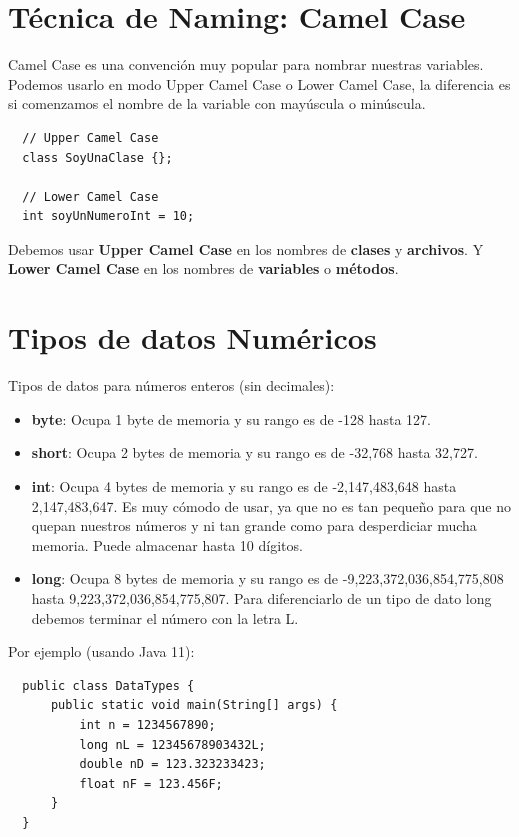 \documentclass{article}
\begin{document}
\section{Técnica de Naming: Camel Case}%
Camel Case es una convención muy popular para nombrar nuestras variables.
Podemos usarlo en modo Upper Camel Case o Lower Camel Case, la diferencia es si
comenzamos el nombre de la variable con mayúscula o minúscula.\\

\begin{verbatim}
  // Upper Camel Case
  class SoyUnaClase {};

  // Lower Camel Case
  int soyUnNumeroInt = 10;
\end{verbatim}

Debemos usar \textbf{Upper Camel Case} en los nombres de \textbf{clases} y
\textbf{archivos}. Y \textbf{Lower Camel Case} en los nombres de
\textbf{variables} o \textbf{métodos}.


\section{Tipos de datos Numéricos}%
Tipos de datos para números enteros (sin decimales):
\begin{itemize}
  \item \textbf{byte}: Ocupa 1 byte de memoria y su rango es de -128 hasta 127.
  \item \textbf{short}: Ocupa 2 bytes de memoria y su rango es de -32,768 hasta 32,727.
  \item \textbf{int}: Ocupa 4 bytes de memoria y su rango es de -2,147,483,648
    hasta 2,147,483,647. Es muy cómodo de usar, ya que no es tan pequeño para
    que no quepan nuestros números y ni tan grande como para desperdiciar mucha
    memoria. Puede almacenar hasta 10 dígitos.
  \item \textbf{long}: Ocupa 8 bytes de memoria y su rango es de
    -9,223,372,036,854,775,808 hasta 9,223,372,036,854,775,807. Para
    diferenciarlo de un tipo de dato long debemos terminar el número con la
    letra L.
\end{itemize}

Por ejemplo (usando Java 11):

\begin{verbatim}
  public class DataTypes {
      public static void main(String[] args) {
          int n = 1234567890;
          long nL = 12345678903432L;
          double nD = 123.323233423;
          float nF = 123.456F;
      }
  }
\end{verbatim}
\end{document}
